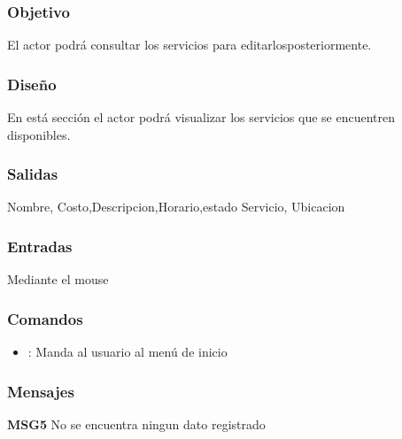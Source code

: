 \subsubsection{Objetivo}
	El actor podrá consultar los servicios para editarlosposteriormente.

\subsubsection{Diseño}
	En está sección el actor podrá visualizar los servicios que se encuentren disponibles.


\subsubsection{Salidas}

	Nombre, Costo,Descripcion,Horario,estado Servicio, Ubicacion

\subsubsection{Entradas}
Mediante el mouse

\subsubsection{Comandos}
\begin{itemize}
	\item {}: Manda al usuario al menú de inicio
\end{itemize}

\subsubsection{Mensajes}
	\begin{Citemize}
		\item {\bf MSG5} No se encuentra ningun dato registrado
	\end{Citemize}